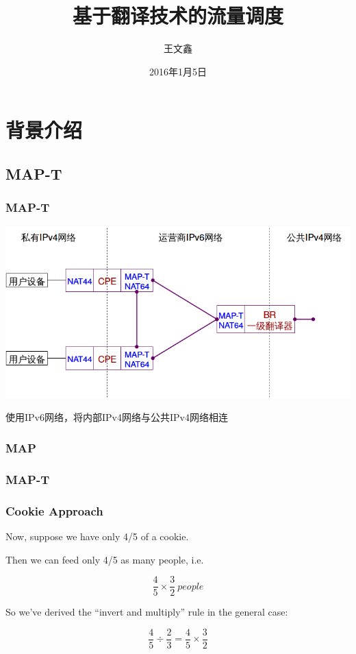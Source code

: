\documentclass{beamer}
\title{基于翻译技术的流量调度}
\author{王文鑫}
\date{2016年1月5日}
\begin{document}
\begin{frame}
\titlepage
\end{frame}

\section{背景介绍}
\subsection{MAP-T}

\begin{frame}
  \frametitle{MAP-T}
  \includegraphics[width=\textwidth]{figs/MAP-T.png}  

  使用IPv6网络，将内部IPv4网络与公共IPv4网络相连
\end{frame}

\begin{frame}
  \frametitle{MAP}
\end{frame}

\begin{frame}
  \frametitle{MAP-T}
\end{frame}

\begin{frame}
  \frametitle{Cookie Approach}

  Now, suppose we have only 4/5 of a cookie.

  Then we can feed only 4/5 as many people, i.e.

  $$
  \frac{4}{5} \times \frac{3}{2} ~ people
  $$

  \pause 

  So we've derived the ``invert and multiply'' rule in the general case:

  $$
  \frac{4}{5} \div \frac{2}{3} = \frac{4}{5} \times \frac{3}{2}
  $$ 

\end{frame}
\end{document}
